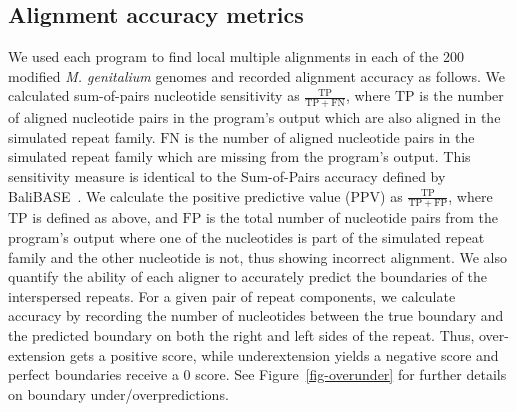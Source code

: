 \documentclass[9.5pt,journal,final,finalsubmission,twocolumn]{IEEEtran}
\begin{document}
\subsection*{Alignment accuracy metrics}
\label{sec:metrics}
We used each program to find local multiple alignments in each of the
200 modified \emph{M. genitalium} genomes and recorded alignment
accuracy as follows. We calculated sum-of-pairs nucleotide sensitivity
as $\frac{\mathrm{TP}}{\mathrm{TP} + \mathrm{FN}}$, where
$\mathrm{TP}$ is the number of aligned nucleotide pairs in the
program's output which are also aligned in the simulated repeat
family.  $\mathrm{FN}$ is the number of aligned nucleotide pairs in
the simulated repeat family which are missing from the program's
output.  This sensitivity measure is identical to the Sum-of-Pairs
accuracy defined by BaliBASE~\cite{ref-balibase}.  We calculate the
positive predictive value (PPV) as $\frac{\mathrm{TP}}{\mathrm{TP} +
\mathrm{FP}}$, where $\mathrm{TP}$ is defined as above, and
$\mathrm{FP}$ is the total number of nucleotide pairs from the
program's output where one of the nucleotides is part of the
simulated repeat family and the other nucleotide is not, thus showing
incorrect alignment. We also quantify the ability of each aligner to accurately predict the
boundaries of the interspersed repeats.  For a given pair of repeat components, we calculate accuracy by recording the number of nucleotides between the true boundary and the predicted boundary
on both the right and left sides of the repeat.  Thus, over-extension gets a positive score, while underextension
yields a negative score and perfect boundaries receive a 0 score. See Figure~\ref{fig-overunder} for
further details on boundary under/overpredictions.
\end{document}
